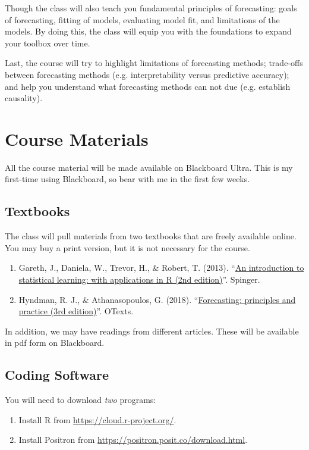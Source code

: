 \documentclass[12pt]{article}
\begin{document}
Though the class will also teach you fundamental principles of forecasting: goals of forecasting, fitting of models, evaluating model fit, and limitations of the models. By doing this, the class will equip you with the foundations to expand your toolbox over time. 

Last, the course will try to highlight limitations of forecasting methods; trade-offs between forecasting methods (e.g. interpretability versus predictive accuracy); and help you understand what forecasting methods can not due (e.g. establish causality). 


\section*{Course Materials}

All the course material will be made available on Blackboard Ultra. This is my first-time using Blackboard, so bear with me in the first few weeks.

\subsection*{Textbooks}

The class will pull materials from two textbooks that are freely available online. You may buy a print version, but it is not necessary for the course. 

\begin{enumerate}
  \item Gareth, J., Daniela, W., Trevor, H., \& Robert, T. (2013). ``\href{https://www.statlearning.com}{An introduction to statistical learning: with applications in R (2nd edition)}''. Spinger.
  \item Hyndman, R. J., \& Athanasopoulos, G. (2018). ``\href{https://otexts.com/fpp3/}{Forecasting: principles and practice (3rd edition)}''. OTexts.
\end{enumerate}

In addition, we may have readings from different articles. These will be available in pdf form on Blackboard.



\subsection*{Coding Software}

You will need to download \emph{two} programs:
\begin{enumerate}
  \item Install R from \url{https://cloud.r-project.org/}.
  \item Install Positron from \url{https://positron.posit.co/download.html}. 
\end{enumerate}
\end{document}
